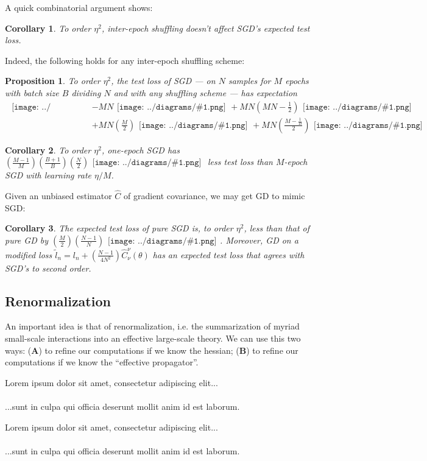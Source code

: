 \documentclass{article}
\newtheorem{cor}{Corollary}
\newtheorem{prop}{Proposition}
\newcommand{\wrap}[1]{\left( #1 \right)}
\newcommand{\dia} [1]{\begin{gathered}\texttt{[image: ../diagrams/\#1.png]}\end{gathered}}
\newcommand{\mdia}[1]{\begin{gathered}\texttt{[image: ../diagrams/\#1.png]}\end{gathered}}
\newcommand{\sdia}[1]{\begin{gathered}\texttt{[image: ../diagrams/\#1.png]}\end{gathered}}
\newcommand{\lorem}[1]{
    Lorem ipsum dolor sit amet, consectetur adipiscing elit...\\
    \nopagebreak\vspace{#1cm} \ \\
    ...sunt in culpa qui officia deserunt mollit anim id est laborum.
}
\begin{document}
    A quick combinatorial argument shows:
    \begin{cor}
        To order $\eta^2$, inter-epoch shuffling doesn't affect SGD's
        expected test loss.
    \end{cor}
    Indeed, the following holds for any inter-epoch shuffling scheme: 
    \begin{prop}
        To order $\eta^2$, the test loss of SGD --- on $N$
        samples for $M$ epochs with batch size $B$ dividing $N$ and with any
        shuffling scheme --- has expectation
        {\small
        \begin{align*}
                                                    \dia{(0)()}
            &- MN                                   \dia{(0-1)(01)}
             + MN\wrap{MN - \frac{1}{2}}            \dia{(0-1-2)(01-12)} \\
            &+ MN\wrap{\frac{M}{2}}                 \dia{c(01-2)(02-12)}  
             + MN\wrap{\frac{M-\frac{1}{B}}{2}}     \dia{c(01-2)(01-12)}
        \end{align*}
        }
    \end{prop}

    \begin{cor}
        To order $\eta^2$, one-epoch SGD has 
        $
             \wrap{\frac{M-1}{M}}\wrap{\frac{B+1}{B}}\wrap{\frac{N}{2}} \mdia{c(01-2)(01-12)}
        $
        less test loss than $M$-epoch SGD with learning rate $\eta/M$. 
    \end{cor}

    Given an unbiased estimator $\hat{C}$ of gradient covariance, we may get
    GD to mimic SGD:
    \begin{cor}
        The expected test loss of pure SGD is, to order $\eta^2$,
        less than that of pure GD by
        $
              \wrap{\frac{M}{2}} \wrap{\frac{N-1}{N}} \sdia{c(01-2)(01-12)}
        $.
        Moreover, GD on a modified loss 
        $
            \tilde l_n = l_n + \wrap{\frac{N-1}{4N^2}} \hat{C}_\nu^\nu(\theta)
        $
        has an expected test loss that agrees with SGD's to second order.
    \end{cor}

\subsection{Renormalization}
    An important idea is that of renormalization, i.e. the summarization of  
    myriad small-scale interactions into an effective large-scale theory. 
    We can use this two ways:
        ({\bf A}) to refine our computations if we know the hessian;  
        ({\bf B}) to refine our computations if we know the ``effective propagator''.
    \lorem{3}
    \lorem{3}
\end{document}
